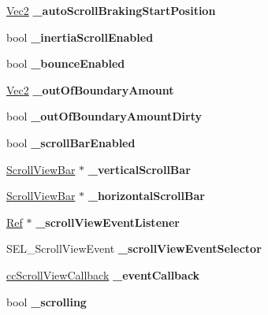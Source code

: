 \begin{DoxyCompactItemize}
\hyperlink{classVec2}{Vec2} {\bfseries \+\_\+auto\+Scroll\+Braking\+Start\+Position}
\item 
\mbox{\label{classui_1_1ScrollView_a5f0877fac7baef7e88c9d9a389d028c3}} 
bool {\bfseries \+\_\+inertia\+Scroll\+Enabled}
\item 
\mbox{\label{classui_1_1ScrollView_a5a9ef9001c146a836debbb801e604ec0}} 
bool {\bfseries \+\_\+bounce\+Enabled}
\item 
\mbox{\label{classui_1_1ScrollView_a6354d0be3caac6d775864828a8a39b1b}} 
\hyperlink{classVec2}{Vec2} {\bfseries \+\_\+out\+Of\+Boundary\+Amount}
\item 
\mbox{\label{classui_1_1ScrollView_a3a184d9fd24d707be4d755e7fd1df6f5}} 
bool {\bfseries \+\_\+out\+Of\+Boundary\+Amount\+Dirty}
\item 
\mbox{\label{classui_1_1ScrollView_a08d16479dd9b603853cf8714fa699c36}} 
bool {\bfseries \+\_\+scroll\+Bar\+Enabled}
\item 
\mbox{\label{classui_1_1ScrollView_a600aa0f5fbab8efdbb02e433cb4543fe}} 
\hyperlink{classui_1_1ScrollViewBar}{Scroll\+View\+Bar} $\ast$ {\bfseries \+\_\+vertical\+Scroll\+Bar}
\item 
\mbox{\label{classui_1_1ScrollView_a033233bee5e4355976ad2d6d3e856b44}} 
\hyperlink{classui_1_1ScrollViewBar}{Scroll\+View\+Bar} $\ast$ {\bfseries \+\_\+horizontal\+Scroll\+Bar}
\item 
\mbox{\label{classui_1_1ScrollView_abfa82b086a66e065a1e04b02f2dee543}} 
\hyperlink{classRef}{Ref} $\ast$ {\bfseries \+\_\+scroll\+View\+Event\+Listener}
\item 
\mbox{\label{classui_1_1ScrollView_a37ef3fad003bbfe5ef3407733f4f085c}} 
S\+E\+L\+\_\+\+Scroll\+View\+Event {\bfseries \+\_\+scroll\+View\+Event\+Selector}
\item 
\mbox{\label{classui_1_1ScrollView_aa2fa0dcf3ee51568c3be062a1d79dad9}} 
\hyperlink{classui_1_1ScrollView_ae836cc55536c3cc4f4db5cb99c3c88d5}{cc\+Scroll\+View\+Callback} {\bfseries \+\_\+event\+Callback}
\item 
\mbox{\label{classui_1_1ScrollView_a3280241e68af7acabf36a56eda3aa604}} 
bool {\bfseries \+\_\+scrolling}
\end{DoxyCompactItemize}
